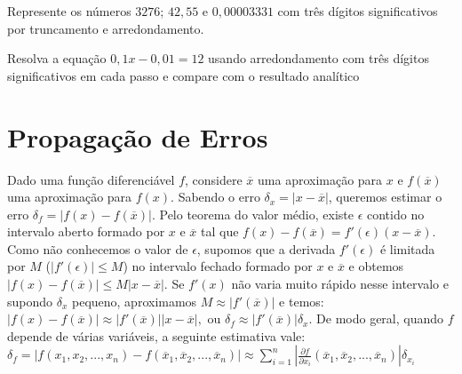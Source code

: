 \begin{prob}  Represente os números $3276$; $42,55$ e $0,00003331$ com três dígitos significativos por truncamento e arredondamento.
\end{prob}

\begin{prob} Resolva a equação $0,1x-0,01=12$ usando arredondamento com três dígitos significativos em cada passo e compare com o resultado analítico
\end{prob}



\section{Propagação de Erros}

Dado uma função diferenciável $f$, considere $\overline{x}$ uma aproximação para $x$ e $f(\overline{x})$ uma aproximação para $f(x)$. Sabendo o erro $\delta_x=|x-\overline{x}|$, queremos estimar o erro $\delta_f=|f(x)-f(\overline{x})|$. Pelo teorema do valor médio, existe $\epsilon$ contido no intervalo aberto formado por $x$ e $\overline{x}$ tal que
$
f(x)-f(\overline{x})=f'(\epsilon)(x-\overline{x}).
$
Como não conhecemos o valor de $\epsilon$, supomos que a derivada $f'(\epsilon)$ é limitada por $M$ ($|f'(\epsilon)|\leq M$) no intervalo fechado formado por $x$ e $\overline{x}$ e obtemos
$
|f(x)-f(\overline{x})|\leq M|x-\overline{x}|.
$
Se $f'(x)$ não varia muito rápido nesse intervalo e supondo $\delta_x$ pequeno, aproximamos $M\approx |f'(\overline{x})|$ e temos:
$
|f(x)-f(\overline{x})|\approx |f'(\overline{x})||x-\overline{x}|,
$
ou
$
\delta_f\approx |f'(\overline{x})|\delta_x.
$
De modo geral, quando $f$ depende de várias variáveis, a seguinte estimativa vale:
$
\delta_f=|f(x_1,x_2,...,x_n)-f(\overline{x}_1, \overline{x}_2,...,\overline{x}_n)|\approx \sum_{i=1}^n\left|\frac{\partial f}{\partial x_i}(\overline{x}_1, \overline{x}_2,...,\overline{x}_n)\right|\delta_{x_i}
$
